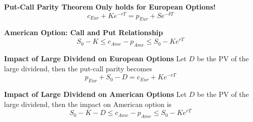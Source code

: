 \documentclass[11pt,fleqn]{report} %
\numberwithin{equation}{section} %
\numberwithin{figure}{section} %
\numberwithin{table}{section} %
\begin{document}
 \begin{theorem}\textbf{Put-Call Parity Theorem}
 \textbf{Only holds for European Options!}
 $$
 c_{Eur}+Ke^{-rT}=p_{Eur}+Se^{-\delta T}
 $$
 \end{theorem}
 \begin{theorem}\textbf{American Option: Call and Put Relationship}
 $$
 S_0-K\leq c_{Ame}-p_{Ame}\leq S_0-Ke^{rT}
 $$
 \end{theorem}
 \begin{theorem}\textbf{Impact of Large Dividend on European Options}
 Let $D$ be the PV of the large dividend, then the put-call parity becomes
 $$
 p_{Eur}+S_0-D=c_{Eur}+Ke^{-rT}
 $$
 \end{theorem}
 \begin{theorem}\textbf{Impact of Large Dividend on American Options}
 Let $D$ be the PV of the large dividend, then the impact on American option is
 $$
 S_0-K-D\leq c_{Ame}-p_{Ame}\leq S_0-Ke^{rT}
 $$
 \end{theorem}
\end{document}
